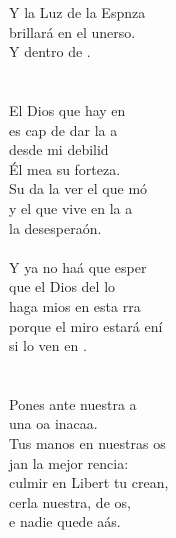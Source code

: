 \begin{cancion}
\begin{chorus}
	Y la Luz de la Espnza \\
	brillará en el unerso.\\
	Y dentro de .\\
\jump\\
	       \\
	El Dios que hay en  \\
	es cap de dar la a \\
	desde mi debilid\\
	Él mea su forteza.\\
	Su da la ver el que mó\\
	y el que vive en la a \\
	 la desesperaón.\\
\jump\\
	Y ya no haá que esper \\
	que el Dios del lo\\
	haga mios en esta rra\\
	porque el miro estará ení \\
	si lo ven en .\\
\jump\\
	       \\
	Pones ante nuestra a \\
	una oa inacaa.\\
	Tus manos en nuestras os \\
	jan la mejor rencia:\\
	culmir en Libert tu crean,  \\
	cerla nuestra, de os,\\
	e nadie quede aás.\\

\end{chorus}
\end{cancion}
